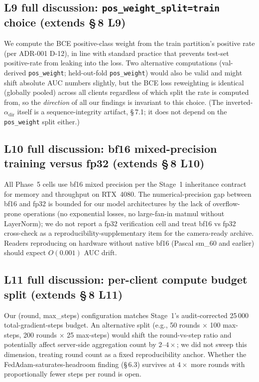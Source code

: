 \documentclass[journal]{IEEEtran}
\newcommand{\alphadir}{\ensuremath{\alpha_{\mathrm{dir}}}}
\begin{document}
\subsection{L9 full discussion: \lstinline|pos_weight_split=train| choice (extends \S\,8 L9)}

We compute the BCE positive-class weight from the train partition's positive rate (per ADR-001 D-12), in line with standard practice that prevents test-set positive-rate from leaking into the loss. Two alternative computations (val-derived \lstinline|pos_weight|; held-out-fold \lstinline|pos_weight|) would also be valid and might shift absolute AUC numbers slightly, but the BCE loss reweighting is identical (globally pooled) across all clients regardless of which split the rate is computed from, so the \emph{direction} of all our findings is invariant to this choice. (The inverted-$\alphadir$ itself is a sequence-integrity artifact, \S\,7.1; it does not depend on the \lstinline|pos_weight| split either.)

\subsection{L10 full discussion: bf16 mixed-precision training versus fp32 (extends \S\,8 L10)}

All Phase~5 cells use bf16 mixed precision per the Stage~1 inheritance contract for memory and throughput on RTX~4080. The numerical-precision gap between bf16 and fp32 is bounded for our model architectures by the lack of overflow-prone operations (no exponential losses, no large-fan-in matmul without LayerNorm); we do not report a fp32 verification cell and treat bf16 vs fp32 cross-check as a reproducibility-supplementary item for the camera-ready archive. Readers reproducing on hardware without native bf16 (Pascal sm\_60 and earlier) should expect $O(0.001)$ AUC drift.

\subsection{L11 full discussion: per-client compute budget split (extends \S\,8 L11)}

Our (round, max\_steps) configuration matches Stage~1's audit-corrected 25\,000 total-gradient-steps budget. An alternative split (e.g., 50 rounds $\times$ 100 max-steps, 200 rounds $\times$ 25 max-steps) would shift the round-vs-step ratio and potentially affect server-side aggregation count by $2$--$4\times$; we did not sweep this dimension, treating round count as a fixed reproducibility anchor. Whether the FedAdam-saturates-headroom finding (\S\,6.3) survives at $4\times$ more rounds with proportionally fewer steps per round is open.
\end{document}
